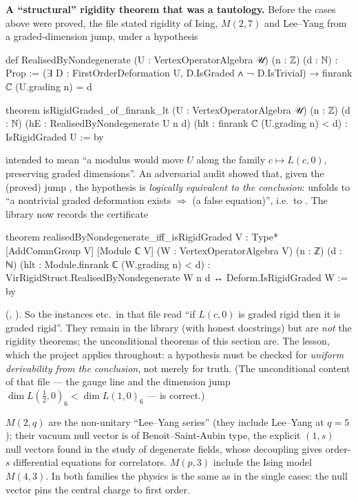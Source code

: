 \begin{warning}\label{l07:warn:tautology}
\textbf{A ``structural'' rigidity theorem that was a tautology.} Before the cases above were proved, the file
 stated rigidity of Ising, $M(2,7)$ and Lee--Yang from a
graded-dimension jump, under a hypothesis
\begin{leancode}
def RealisedByNondegenerate (U : VertexOperatorAlgebra 𝒰) (n : ℤ) (d : ℕ) : Prop :=
  (∃ D : FirstOrderDeformation U, D.IsGraded ∧ ¬ D.IsTrivial) → finrank ℂ (U.grading n) = d

theorem isRigidGraded_of_finrank_lt (U : VertexOperatorAlgebra 𝒰) (n : ℤ) (d : ℕ)
    (hE : RealisedByNondegenerate U n d) (hlt : finrank ℂ (U.grading n) < d) :
    IsRigidGraded U := by
\end{leancode}
intended to mean ``a modulus would move $U$ along the family $c\mapsto L(c,0)$, preserving graded dimensions''.
An adversarial audit showed that, given the (proved) jump , the hypothesis  is
\emph{logically equivalent to the conclusion}:  unfolds to ``a nontrivial graded deformation exists
$\Rightarrow$ (a false equation)'', i.e.\ to . The library now records the certificate
\begin{leancode}
theorem realisedByNondegenerate_iff_isRigidGraded
    {V : Type*} [AddCommGroup V] [Module ℂ V] (W : VertexOperatorAlgebra V)
    (n : ℤ) (d : ℕ) (hlt : Module.finrank ℂ (W.grading n) < d) :
    VirRigidStruct.RealisedByNondegenerate W n d ↔ Deform.IsRigidGraded W := by
\end{leancode}
(,
). So the instances
 etc.\ in that file read ``if $L(c,0)$ is graded rigid then it is graded
rigid''. They remain in the library (with honest docstrings) but are \emph{not} the rigidity theorems; the
unconditional theorems of this section are. The lesson, which the project applies throughout: a hypothesis
must be checked for \emph{uniform derivability from the conclusion}, not merely for truth. (The unconditional
content of that file --- the gauge line and the dimension jump
$\dim L(\frac12,0)_6<\dim L(1,0)_6$ --- is correct.)
\end{warning}

\begin{physics}
$M(2,q)$ are the non-unitary ``Lee--Yang series'' (they include Lee--Yang at $q=5$); their vacuum null vector
is of Benoit--Saint-Aubin type, the explicit $(1,s)$ null vectors found in the study of degenerate fields, whose
decoupling gives order-$s$ differential equations for correlators. $M(p,3)$ include the Ising model
$M(4,3)$. In both families the physics is the same as in the single cases: the null vector pins the central
charge to first order.
\end{physics}


